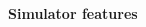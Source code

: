 \documentclass[
    beamer                                       %
  ,table,dvipsnames,svgnames
]{common/mytemplate}
\begin{document}
\renewcommand{\frametitle}[2]{{\vspace*{10pt}\bf\Large #1\par}}






% 
% 
% 

\begin{frame}
\frametitle{Simulator features}
\framesubtitle{}
\begin{figure}[H]
\begin{narrow}{-0.6cm}{-0.6cm}
\end{narrow}
\end{figure}                                                                                                                                                                                                                                                                                                   
\end{frame}
\end{document}
